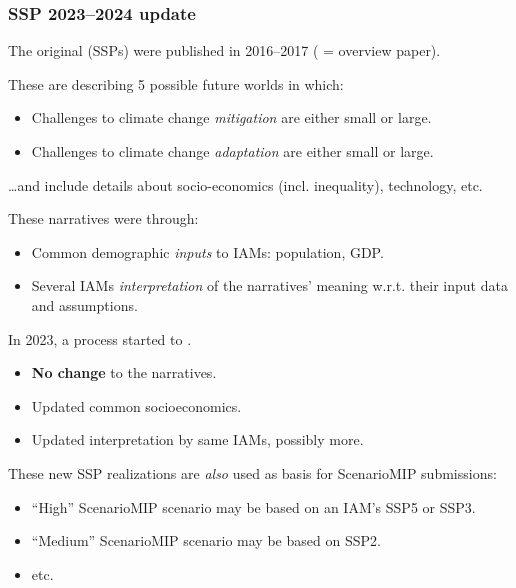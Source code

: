 \documentclass[12pt,aspectratio=169]{beamer}
\begin{document}
\begin{frame}[allowframebreaks]
\frametitle{SSP 2023–2024 update}
The original  (SSPs) were published in 2016–2017 (\textcite{riahi-2017} = overview paper).

\bigskip
These are  describing 5 possible future worlds in which:
\begin{itemize}
  \item Challenges to climate change \emph{mitigation} are either small or large.
  \item Challenges to climate change \emph{adaptation} are either small or large.
\end{itemize}
…and include details about socio-economics (incl. inequality), technology, etc.

\bigskip
These narratives were  through:
\begin{itemize}
  \item Common demographic \emph{inputs} to IAMs: population, GDP.
  \item Several IAMs \emph{interpretation} of the narratives' meaning w.r.t. their input data and assumptions.
\end{itemize}

\framebreak
In 2023, a process started to .
\begin{itemize}
  \item \textbf{No change} to the narratives.
  \item Updated common socioeconomics.
  \item Updated interpretation by same IAMs, possibly more.
\end{itemize}

\bigskip
These new SSP realizations are \emph{also} used as basis for ScenarioMIP submissions:
\begin{itemize}
  \item “High” ScenarioMIP scenario may be based on an IAM's SSP5 or SSP3.
  \item “Medium” ScenarioMIP scenario may be based on SSP2.
  \item etc.
\end{itemize}

\end{frame}
\end{document}
